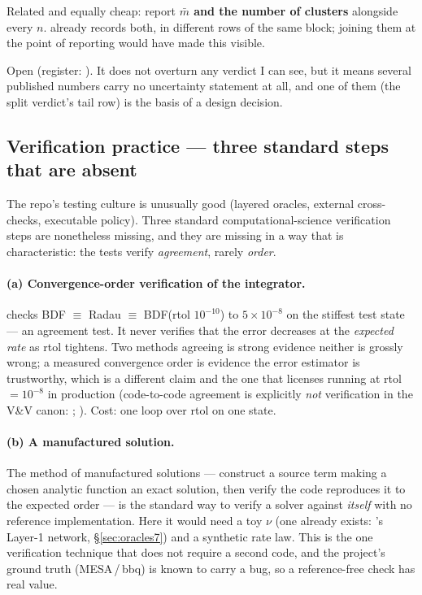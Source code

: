 Related and equally cheap: report \textbf{$\bar m$ and the number of clusters}
alongside every $n$.  already records both, in different rows
of the same block; joining them at the point of reporting would have made this
visible.

Open (register: ). It does not overturn any verdict I can see, but it
means several published numbers carry no uncertainty statement at all, and one
of them (the split verdict's tail row) is the basis of a design decision.

\subsection{Verification practice --- three standard steps that are absent}
\label{sec:vandv}

The repo's testing culture is unusually good (layered oracles, external
cross-checks, executable policy). Three standard computational-science
verification steps are nonetheless missing, and they are missing in a way that
is characteristic: the tests verify \emph{agreement}, rarely \emph{order}.

\paragraph{(a) Convergence-order verification of the integrator.}
 checks BDF $\equiv$ Radau $\equiv$ BDF(rtol
$10^{-10}$) to $5\times10^{-8}$ on the stiffest test state
 --- an agreement test. It never verifies that the error
decreases at the \emph{expected rate} as rtol tightens. Two methods agreeing is
strong evidence neither is grossly wrong; a measured convergence order is
evidence the error estimator is trustworthy, which is a different claim and the
one that licenses running at rtol $= 10^{-8}$ in production (code-to-code
agreement is explicitly \emph{not} verification in the V\&V canon:
\citealp{roache1998}; \citealp{oberkampf2010}). Cost: one loop over rtol on one
state.

\paragraph{(b) A manufactured solution.} The method of manufactured solutions
\citep{roache2002, salari2000} --- construct a source term making a chosen
analytic function an exact solution, then verify the code reproduces it to the
expected order --- is the standard way to verify a solver against \emph{itself}
with no reference implementation. Here it would need a toy $\nu$ (one already
exists: 's Layer-1 network, \S\ref{sec:oracles7})
and a synthetic rate law. This is the one verification technique that does not
require a second code, and the project's ground truth (MESA\,/\,bbq) is known to
carry a bug, so a reference-free check has real value.

